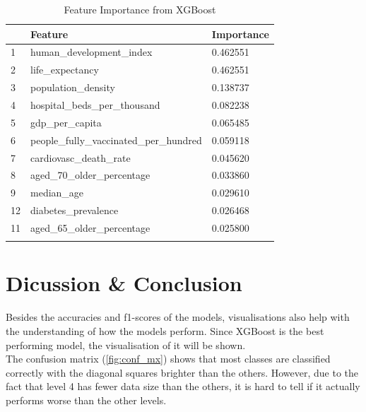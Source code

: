 \documentclass[10pt, a4paper, twocolumn]{article} %
\begin{document}
\begin{table}
	\caption{Feature Importance from XGBoost}
	\centering
	\begin{tabular}{lll}
		\toprule
		& \textbf{Feature} & \textbf{Importance} \\
		\midrule
		1& human\_development\_index & 0.462551 \\
		2& life\_expectancy& 0.462551\\
		3& population\_density& 0.138737\\
		4& hospital\_beds\_per\_thousand& 0.082238\\
		5& gdp\_per\_capita& 0.065485\\
		6& people\_fully\_vaccinated\_per\_hundred& 0.059118\\
		7& cardiovasc\_death\_rate& 0.045620\\
		8& aged\_70\_older\_percentage& 0.033860\\
		9& median\_age& 0.029610\\
		12& diabetes\_prevalence& 0.026468\\
		11& aged\_65\_older\_percentage& 0.025800\\
		\bottomrule
	\label{tab:feature_importance}
	\end{tabular}
\end{table}
\section{Dicussion \& Conclusion}\label{sec:discussion}
Besides the accuracies and f1-scores of the models, visualisations also help with the understanding 
of how the models perform. Since XGBoost is the best performing model, the visualisation of it will be shown. \\[5pt]

The confusion matrix (\autoref{fig:conf_mx}) shows that most classes are classified correctly with the diagonal squares brighter 
than the others. However, due to the fact that level 4 has fewer data size than the others, it is hard to 
tell if it actually performs worse than the other levels. \\[5pt]
\end{document}
